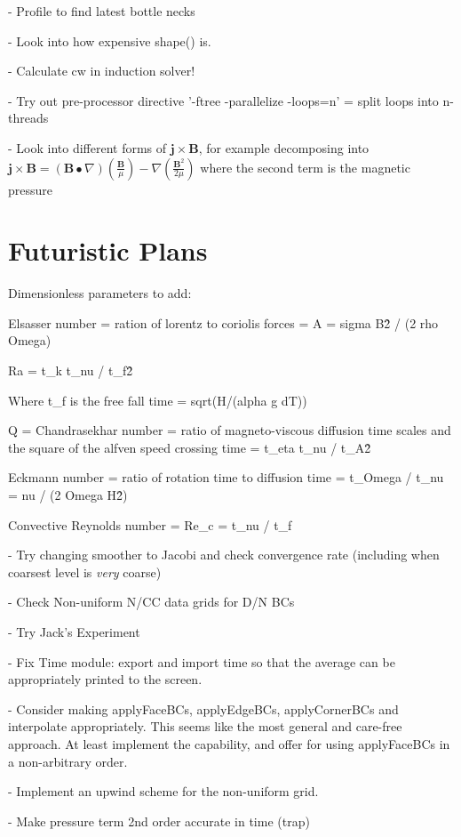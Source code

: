 \documentclass[3p,twocolumn,10pt]{elsarticle}
\begin{document}
- Profile to find latest bottle necks

- Look into how expensive shape() is.

- Calculate cw in induction solver!

- Try out pre-processor directive '-ftree -parallelize -loops=n' = split loops into n-threads

- Look into different forms of $\mathbf{j}\times \mathbf{B}$, for example 
decomposing into $\mathbf{j}\times \mathbf{B} = (\mathbf{B}\bullet\nabla) \left(\frac{\mathbf{B}}{\mu}\right) - \nabla \left( \frac{\mathbf{B}^2}{2\mu} \right)$ where the second term is the magnetic pressure

\section{Futuristic Plans}

Dimensionless parameters to add:

Elsasser number = ration of lorentz to coriolis forces = A = sigma B\^2 / (2 rho Omega)

Ra = t\_k t\_nu / t\_f\^2

Where t\_f is the free fall time = sqrt(H/(alpha g dT))

Q = Chandrasekhar number = ratio of magneto-viscous diffusion time scales and the square of the alfven speed crossing time
 = t\_eta t\_nu / t\_A\^2

Eckmann number = ratio of rotation time to diffusion time
 = t\_Omega / t\_nu = nu / (2 Omega H\^2)


Convective Reynolds number = Re\_c = t\_nu / t\_f

- Try changing smoother to Jacobi and check convergence rate (including when coarsest level is \textit{very} coarse)

- Check Non-uniform N/CC data grids for D/N BCs

- Try Jack's Experiment

- Fix Time module: export and import time so that the average can be appropriately
printed to the screen.

- Consider making applyFaceBCs, applyEdgeBCs, applyCornerBCs and interpolate appropriately. This seems like the most general and care-free approach. At least implement the capability, and offer for using applyFaceBCs in a non-arbitrary order.

- Implement an upwind scheme for the non-uniform grid.

- Make pressure term 2nd order accurate in time (trap)
\end{document}
